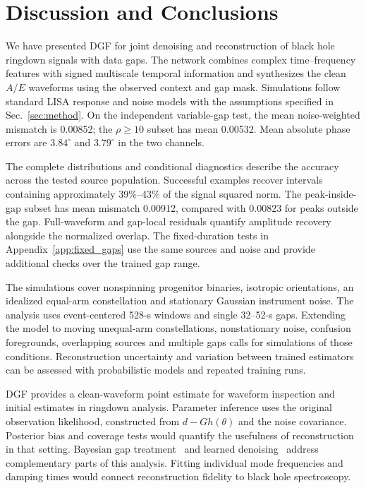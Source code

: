 \documentclass[10pt,prd,aps,a4paper,twocolumn,superscriptaddress,nofootinbib,floatfix]{revtex4-2}
\begin{document}
\section{Discussion and Conclusions}\label{sec:discussion}
We have presented DGF for joint denoising and reconstruction of black hole ringdown signals with data gaps. The network combines complex time--frequency features with signed multiscale temporal information and synthesizes the clean $A/E$ waveforms using the observed context and gap mask. Simulations follow standard LISA response and noise models with the assumptions specified in Sec.~\ref{sec:method}. On the independent variable-gap test, the mean noise-weighted mismatch is 0.00852; the $\rho\ge10$ subset has mean 0.00532. Mean absolute phase errors are $3.84^\circ$ and $3.79^\circ$ in the two channels.

The complete distributions and conditional diagnostics describe the accuracy across the tested source population. Successful examples recover intervals containing approximately 39\%--43\% of the signal squared norm. The peak-inside-gap subset has mean mismatch 0.00912, compared with 0.00823 for peaks outside the gap. Full-waveform and gap-local residuals quantify amplitude recovery alongside the normalized overlap. The fixed-duration tests in Appendix~\ref{app:fixed_gaps} use the same sources and noise and provide additional checks over the trained gap range.

The simulations cover nonspinning progenitor binaries, isotropic orientations, an idealized equal-arm constellation and stationary Gaussian instrument noise. The analysis uses event-centered 528-s windows and single 32--52-s gaps. Extending the model to moving unequal-arm constellations, nonstationary noise, confusion foregrounds, overlapping sources and multiple gaps calls for simulations of those conditions. Reconstruction uncertainty and variation between trained estimators can be assessed with probabilistic models and repeated training runs.

DGF provides a clean-waveform point estimate for waveform inspection and initial estimates in ringdown analysis. Parameter inference uses the original observation likelihood, constructed from $d-Gh(\theta)$ and the noise covariance. Posterior bias and coverage tests would quantify the usefulness of reconstruction in that setting. Bayesian gap treatment~\cite{Baghi2019} and learned denoising~\cite{Wang:2024waveformer} address complementary parts of this analysis. Fitting individual mode frequencies and damping times would connect reconstruction fidelity to black hole spectroscopy.
\end{document}
